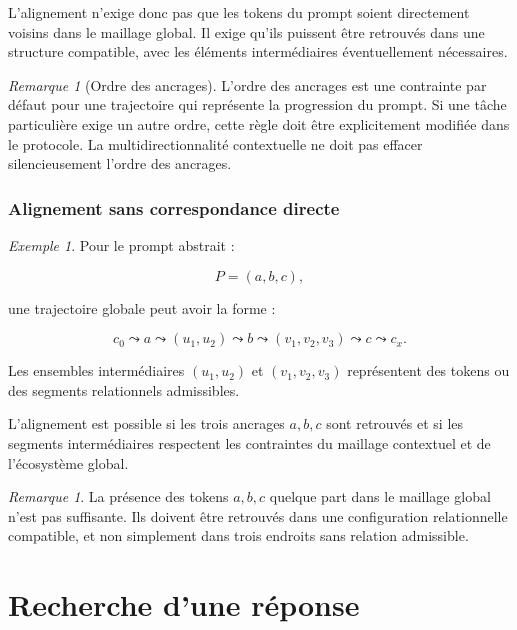 \documentclass[11pt,a4paper,oneside]{book}
\theoremstyle{remark}
\newtheorem{remarque}[definition]{Remarque}
\newtheorem{exemple}[definition]{Exemple}
\begin{document}
L'alignement n'exige donc pas que les tokens du prompt soient
directement voisins dans le maillage global. Il exige qu'ils puissent
être retrouvés dans une structure compatible, avec les éléments
intermédiaires éventuellement nécessaires.

\begin{remarque}[Ordre des ancrages]
L'ordre des ancrages est une contrainte par défaut pour une
trajectoire qui représente la progression du prompt. Si une tâche
particulière exige un autre ordre, cette règle doit être explicitement
modifiée dans le protocole. La multidirectionnalité contextuelle
ne doit pas effacer silencieusement l'ordre des ancrages.
\end{remarque}

\section{Alignement sans correspondance directe}

\begin{exemple}
Pour le prompt abstrait :

\[
P=(a,b,c),
\]

une trajectoire globale peut avoir la forme :

\[
c_0\leadsto a\leadsto
(u_1,u_2)\leadsto b\leadsto
(v_1,v_2,v_3)\leadsto c\leadsto c_x.
\]

Les ensembles intermédiaires \((u_1,u_2)\) et
\((v_1,v_2,v_3)\) représentent des tokens ou des segments
relationnels admissibles.

L'alignement est possible si les trois ancrages \(a,b,c\) sont
retrouvés et si les segments intermédiaires respectent les contraintes
du maillage contextuel et de l'écosystème global.
\end{exemple}

\begin{remarque}
La présence des tokens \(a,b,c\) quelque part dans le maillage
global n'est pas suffisante. Ils doivent être retrouvés dans une
configuration relationnelle compatible, et non simplement dans
trois endroits sans relation admissible.
\end{remarque}


\part{Recherche d'une réponse}
\end{document}
